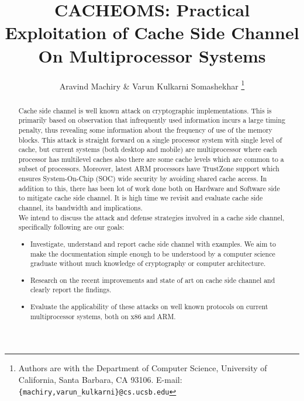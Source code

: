 \documentclass[twocolumn]{IEEEtran}
\begin{document}
\title{CACHEOMS: Practical Exploitation of \textbf{Cache} Side Channel \textbf{O}n \textbf{M}ultiprocessor \textbf{S}ystems}


\author{Aravind Machiry \& Varun Kulkarni Somashekhar
\thanks{Authors are with the
Department of Computer Science,
University of California, Santa Barbara, CA 93106.
E-mail: \texttt{\{machiry,varun\_kulkarni\}@cs.ucsb.edu}}
}

\maketitle

\begin{abstract}
Cache side channel is well known attack on cryptographic implementations\cite{bernstein2005cache}\cite{aciccmez2006trace}\cite{banescu2011cache}. This is primarily based on observation that infrequently used information incurs a large timing penalty, thus revealing some information about the frequency of use of the memory blocks. This attack is straight forward on a single processor system with single level of cache, but current systems (both desktop and mobile) are multiprocessor where each processor has multilevel caches also there are some cache levels which are common to a subset of processors. Moreover, latest ARM processors have TrustZone support\cite{frenzel2010arm} which ensures System-On-Chip (SOC) wide security by avoiding shared cache access. In addition to this, there has been lot of work done both on Hardware and Software side to mitigate cache side channel\cite{180212}\cite{wang2007new}. It is high time we revisit and evaluate cache side channel, its bandwidth and implications\cite{184415}.\\
We intend to discuss the attack and defense strategies involved in a cache side channel, specifically following are our goals:
\begin{itemize}
\item Investigate, understand and report cache side channel with examples. We aim to make the documentation simple enough to be understood by a computer science graduate without much knowledge of cryptography or computer architecture.
\item Research on the recent improvements and state of art on cache side channel and clearly report the findings.
\item Evaluate the applicability of these attacks on well known protocols on current multiprocessor systems, both on x86 and ARM.
\end{itemize}
\end{abstract}
\end{document}
